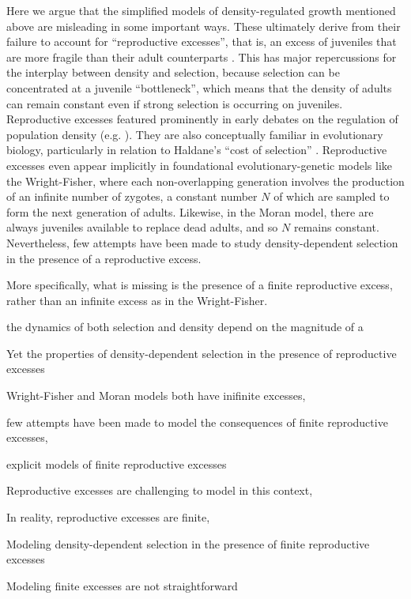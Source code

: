 \documentclass[12pt]{article}
\begin{document}
Here we argue that the simplified models of density-regulated growth mentioned above are misleading in some important ways. These ultimately derive from their failure to account for ``reproductive excesses'', that is, an excess of juveniles that are more fragile than their adult counterparts \citep{turner1968population}. This has major repercussions for the interplay between density and selection, because selection can be concentrated at a juvenile ``bottleneck'', which means that the density of adults can remain constant even if strong selection is occurring on juveniles. Reproductive excesses featured prominently in early debates on the regulation of population density (e.g. \citealt{nicholson_1954}). They are also conceptually familiar in evolutionary biology, particularly in relation to Haldane's ``cost of selection'' \citep{haldane_1957,turner1968population}. Reproductive excesses even appear implicitly in foundational evolutionary-genetic models like the Wright-Fisher, where each non-overlapping generation involves the production of an infinite number of zygotes, a constant number $N$ of which are sampled to form the next generation of adults. Likewise, in the Moran model, there are always juveniles available to replace dead adults, and so $N$ remains constant. Nevertheless, few attempts have been made to study density-dependent selection in the presence of a reproductive excess. 

More specifically, what is missing is the presence of a finite reproductive excess, rather than an infinite excess as in the Wright-Fisher. 

the dynamics of both selection and density depend on the magnitude of a

Yet the properties of density-dependent selection in the presence of reproductive excesses  

Wright-Fisher and Moran models both have inifinite excesses, 

few attempts have been made to model the consequences of finite reproductive excesses, 



 explicit models of finite reproductive excesses 

Reproductive excesses are challenging to model in this context, 

In reality, reproductive excesses are finite, 


 Modeling density-dependent selection in the presence of finite reproductive excesses

Modeling finite excesses are not straightforward
\end{document}
